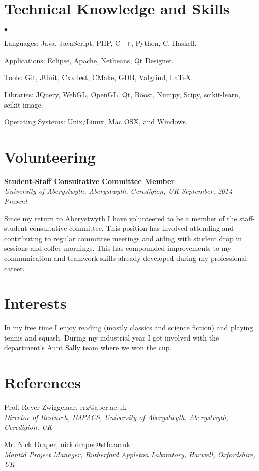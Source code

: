 \documentclass[margin,line]{res}
\newenvironment{list2}{
  \begin{list}{$\bullet$}{%
      \setlength{\itemsep}{0in}
      \setlength{\parsep}{0in} \setlength{\parskip}{0in}
      \setlength{\topsep}{0in} \setlength{\partopsep}{0in}
      \setlength{\leftmargin}{0.2in}}}{\end{list}}
\begin{document}
\begin{resume}
\section{\sc Technical Knowledge and  Skills}
\begin{list2}
\item Languages: Java, JavaScript, PHP, C++, Python, C, Haskell.
\item Applications: Eclipse, Apache, Netbeans, Qt Designer.
\item Tools: Git, JUnit, CxxTest, CMake, GDB, Valgrind, \LaTeX.
\item Libraries: JQuery, WebGL, OpenGL, Qt, Boost, Numpy, Scipy, scikit-learn, scikit-image.
\item Operating Systems:  Unix/Linux, Mac OSX, and Windows.\\
\end{list2}

\section{\sc Volunteering}
{\bf Student-Staff Consultative Committee Member} \\
{\it University of Aberystwyth, Aberystwyth, Ceredigion, UK} \hfill {\it September, 2014 - Present}

Since my return to Aberystwyth I have volunteered to be a member of the staff-student consultative committee. This position has involved attending and contributing to regular committee meetings and aiding with student drop in sessions and coffee mornings. This has compounded improvements to my communication and teamwork skills already developed during my professional career.

\section{\sc Interests}
In my free time I enjoy reading (mostly classics and science fiction) and playing tennis and squash. During my industrial year I got involved with the department's Aunt Sally team where we won the cup.

\section{\sc References}
Prof. Reyer Zwiggelaar, rrz@aber.ac.uk \\
{\em Director of Research, IMPACS, University of Aberystwyth, Aberystwyth, Ceredigion, UK}

Mr. Nick Draper, nick.draper@stfc.ac.uk \\
{\em Mantid Project Manager, Rutherford Appleton Laboratory, Harwell, Oxfordshire, UK}

\end{resume}
\end{document}

